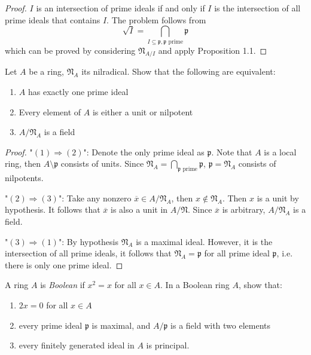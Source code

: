 \documentclass{solution}
\begin{document}
\begin{proof}
    $I$ is an intersection of prime ideals if and only if $I$ is the intersection of all prime ideals that contains $I$. The problem follows from
    $$\sqrt{I} = \bigcap\limits_{I \subseteq \mathfrak{p}, \mathfrak{p} \text { prime}} \mathfrak{p}$$
    which can be proved by considering $\mathfrak{N}_{A / I}$ and apply Proposition 1.1.
\end{proof}

\begin{problem}
    Let $A$ be a ring, $\mathfrak{N}_A$ its nilradical. Show that the following are equivalent:
    \begin{enumerate}
        \item $A$ has exactly one prime ideal
        \item Every element of $A$ is either a unit or nilpotent
        \item $A / \mathfrak{N}_A$ is a field
    \end{enumerate}
\end{problem}

\begin{proof}
    "$(1) \Rightarrow (2)$": Denote the only prime ideal as $\mathfrak{p}$. Note that $A$ is a local ring, then $A \setminus \mathfrak{p}$ consists of units. Since $\mathfrak{N}_A = \bigcap\limits_{\mathfrak{p} \text{ prime}} \mathfrak{p}$, $\mathfrak{p} = \mathfrak{N}_A$ consists of nilpotents.

    "$(2) \Rightarrow (3)$": Take any nonzero $\overline{x} \in A / \mathfrak{N}_A$, then $x \notin \mathfrak{N}_A$. Then $x$ is a unit by hypothesis. It follows that $\overline{x}$ is also a unit in $A / \mathfrak{N}$. Since $\overline{x}$ is arbitrary, $A / \mathfrak{N}_A$ is a field.

    "$(3) \Rightarrow (1)$": By hypothesis $\mathfrak{N}_A$ is a maximal ideal. However, it is the intersection of all prime ideals, it follows that $\mathfrak{N}_A = \mathfrak{p}$ for all prime ideal $\mathfrak{p}$, i.e. there is only one prime ideal. 
\end{proof}

\begin{problem}
    A ring $A$ is \textit{Boolean} if $x^2 = x$ for all $x \in A$. In a Boolean ring $A$, show that:
    \begin{enumerate}
        \item $2x = 0$ for all $x \in A$
        \item every prime ideal $\mathfrak{p}$ is maximal, and $A / \mathfrak{p}$ is a field with two elements
        \item every finitely generated ideal in $A$ is principal.
    \end{enumerate}
\end{problem}
\end{document}
